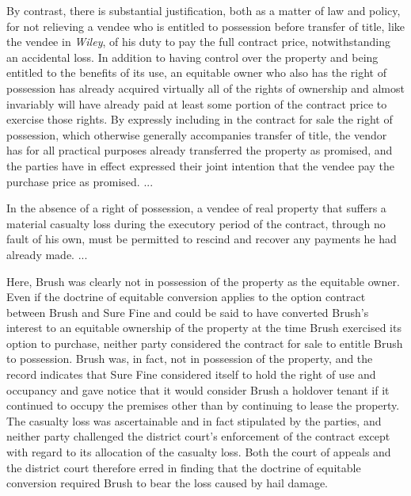 By contrast, there is substantial justification, both as a matter of law and
policy, for not relieving a vendee who is entitled to possession before
transfer of title, like the vendee in \textit{Wiley}, of his duty to pay the
full contract price, notwithstanding an accidental loss. In addition to having
control over the property and being entitled to the benefits of its use, an
equitable owner who also has the right of possession has already acquired
virtually all of the rights of ownership and almost invariably will have
already paid at least some portion of the contract price to exercise those
rights. By expressly including in the contract for sale the right of
possession, which otherwise generally accompanies transfer of title, the vendor
has for all practical purposes already transferred the property as promised,
and the parties have in effect expressed their joint intention that the vendee
pay the purchase price as promised. ... 

In the absence of a right of possession, a vendee of real property that suffers
a material casualty loss during the executory period of the contract, through
no fault of his own, must be permitted to rescind and recover any payments he
had already made. ... 

Here, Brush was clearly not in possession of the property as the equitable
owner. Even if the doctrine of equitable conversion applies to the option
contract between Brush and Sure Fine and could be said to have converted
Brush's interest to an equitable ownership of the property at the time Brush
exercised its option to purchase, neither party considered the contract for
sale to entitle Brush to possession. Brush was, in fact, not in possession of
the property, and the record indicates that Sure Fine considered itself to hold
the right of use and occupancy and gave notice that it would consider Brush a
holdover tenant if it continued to occupy the premises other than by continuing
to lease the property. The casualty loss was ascertainable and in fact
stipulated by the parties, and neither party challenged the district court's
enforcement of the contract except with regard to its allocation of the
casualty loss. Both the court of appeals and the district court therefore erred
in finding that the doctrine of equitable conversion required Brush to bear the
loss caused by hail damage. 


